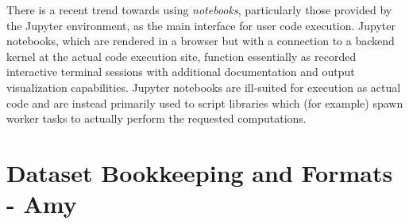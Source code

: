 There is a recent trend towards using \textit{notebooks}, particularly those provided by the Jupyter environment, as the main interface for user code execution. Jupyter notebooks, which are rendered in a browser but with a connection to a backend kernel at the actual code execution site, function essentially as recorded interactive terminal sessions with additional documentation and output visualization capabilities. Jupyter notebooks are ill-suited for execution as actual code and are instead primarily used to script libraries which (for example) spawn worker tasks to actually perform the requested computations.

\section{Dataset Bookkeeping and Formats - Amy}
